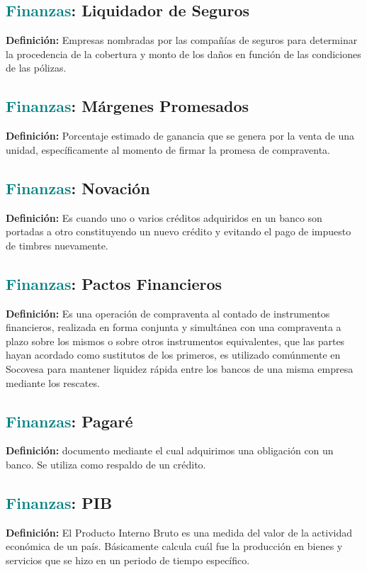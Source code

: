 \documentclass[12pt]{article}
\begin{document}
\subsection{\textcolor{teal}{Finanzas}: Liquidador de Seguros}
\textbf{Definición:} Empresas nombradas por las compañías de seguros para determinar la procedencia de la cobertura y monto de los daños en función de las condiciones de las pólizas.
\subsection{\textcolor{teal}{Finanzas}: Márgenes Promesados}
\textbf{Definición:} Porcentaje estimado de ganancia que se genera por la venta de una unidad, específicamente al momento de firmar la promesa de compraventa.
\subsection{\textcolor{teal}{Finanzas}: Novación}
\textbf{Definición:} Es cuando uno o varios créditos adquiridos en un banco son portadas a otro constituyendo un nuevo crédito y evitando el pago de impuesto de timbres nuevamente.
\subsection{\textcolor{teal}{Finanzas}: Pactos Financieros}
\textbf{Definición:} Es una operación de compraventa al contado de instrumentos financieros, realizada en forma conjunta y simultánea con una compraventa a plazo sobre los mismos o sobre otros instrumentos equivalentes, que las partes hayan acordado como sustitutos de los primeros, es utilizado comúnmente en Socovesa para mantener liquidez rápida entre los bancos de una misma empresa mediante los rescates.
\subsection{\textcolor{teal}{Finanzas}: Pagaré}
\textbf{Definición:} documento mediante el cual adquirimos una obligación con un banco. Se utiliza como respaldo de un crédito.
\subsection{\textcolor{teal}{Finanzas}: PIB}
\textbf{Definición:} El Producto Interno Bruto es una medida del valor de la actividad económica de un país. Básicamente calcula cuál fue la producción en bienes y servicios que se hizo en un periodo de tiempo específico.
\end{document}
